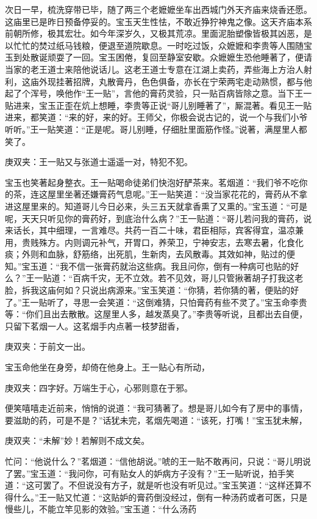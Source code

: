 \begin{parag}
    次日一早，梳洗穿带已毕，随了两三个老嬷嬷坐车出西城门外天齐庙来烧香还愿。这庙里已是昨日预备停妥的。宝玉天生性怯，不敢近狰狞神鬼之像。这天齐庙本系前朝所修，极其宏壮。如今年深岁久，又极其荒凉。里面泥胎塑像皆极其凶恶，是以忙忙的焚过纸马钱粮，便退至道院歇息。一时吃过饭，众嬷嬷和李贵等人围随宝玉到处散诞顽耍了一回。宝玉困倦，复回至静室安歇。众嬷嬷生恐他睡著了，便请当家的老王道士来陪他说话儿。这老王道士专意在江湖上卖药，弄些海上方治人射利，这庙外现挂著招牌，丸散膏丹，色色俱备，亦长在宁荣两宅走动熟惯，都与他起了个浑号，唤他作“王一贴”，言他的膏药灵验，只一贴百病皆除之意。当下王一贴进来，宝玉正歪在炕上想睡，李贵等正说“哥儿别睡著了”，厮混著。看见王一贴进来，都笑道：“来的好，来的好。王师父，你极会说古记的，说一个与我们小爷听听。”王一贴笑道：“正是呢。哥儿别睡，仔细肚里面筋作怪。”说著，满屋里人都笑了。\begin{note}庚双夹：王一贴又与张道士遥遥一对，特犯不犯。\end{note}宝玉也笑著起身整衣。王一贴喝命徒弟们快泡好酽茶来。茗烟道：“我们爷不吃你的茶，连这屋里坐著还嫌膏药气息呢。”王一贴笑道：“没当家花花的，膏药从不拿进这屋里来的。知道哥儿今日必来，头三五天就拿香熏了又熏的。”宝玉道：“可是呢，天天只听见你的膏药好，到底治什么病？”王一贴道：“哥儿若问我的膏药，说来话长，其中细理，一言难尽。共药一百二十味，君臣相际，宾客得宜，温凉兼用，贵贱殊方。内则调元补气，开胃口，养荣卫，宁神安志，去寒去暑，化食化痰；外则和血脉，舒筋络，出死肌，生新肉，去风散毒。其效如神，贴过的便知。”宝玉道：“我不信一张膏药就治这些病。我且问你，倒有一种病可也贴的好么？”王一贴道：“百病千灾，无不立效。若不见效，哥儿只管揪著胡子打我这老脸，拆我这庙何如？只说出病源来。”宝玉笑道：“你猜，若你猜的著，便贴的好了。”王一贴听了，寻思一会笑道：“这倒难猜，只怕膏药有些不灵了。”宝玉命李贵等：“你们且出去散散。这屋里人多，越发蒸臭了。”李贵等听说，且都出去自便，只留下茗烟一人。这茗烟手内点著一枝梦甜香，\begin{note}庚双夹：于前文一出。\end{note}宝玉命他坐在身旁，却倚在他身上。王一贴心有所动，\begin{note}庚双夹：四字好。万端生于心，心邪则意在于邪。\end{note}便笑嘻嘻走近前来，悄悄的说道：“我可猜著了。想是哥儿如今有了房中的事情，要滋助的药，可是不是？”话犹未完，茗烟先喝道：“该死，打嘴！”宝玉犹未解，\begin{note}庚双夹：“未解”妙！若解则不成文矣。\end{note}忙问：“他说什么？”茗烟道：“信他胡说。”唬的王一贴不敢再问，只说：“哥儿明说了罢。”宝玉道：“我问你，可有贴女人的妒病方子没有？”王一贴听说，拍手笑道：“这可罢了。不但说没有方子，就是听也没有听见过。”宝玉笑道：“这样还算不得什么。”王一贴又忙道：“这贴妒的膏药倒没经过，倒有一种汤药或者可医，只是慢些儿，不能立竿见影的效验。”宝玉道：“什么汤药
\end{parag}
